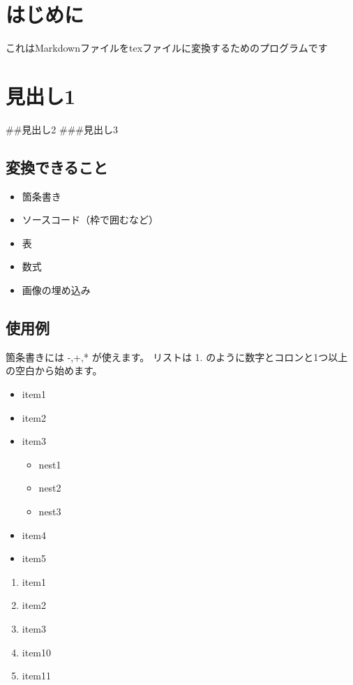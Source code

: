 \documentclass[a4j]{jarticle}
\begin{document}
\section{はじめに}

これはMarkdownファイルをtexファイルに変換するためのプログラムです

\section{見出し1}

\#\#見出し2
\#\#\#見出し3

\subsection{変換できること}

\begin{itemize}
\item 箇条書き
\item ソースコード（枠で囲むなど）
\item 表
\item 数式
\item 画像の埋め込み
\end{itemize}

\subsection{使用例}

箇条書きには -,+,* が使えます。
リストは 1. のように数字とコロンと1つ以上の空白から始めます。

\begin{itemize}
\item item1
\item item2
\item item3


\begin{itemize}
\item nest1
\item nest2
\item nest3
\end{itemize}
\item item4
\item item5
\end{itemize}

\begin{enumerate}
\item item1
\item item2
\item item3
\item item10
\item item11
\end{enumerate}
\end{document}
